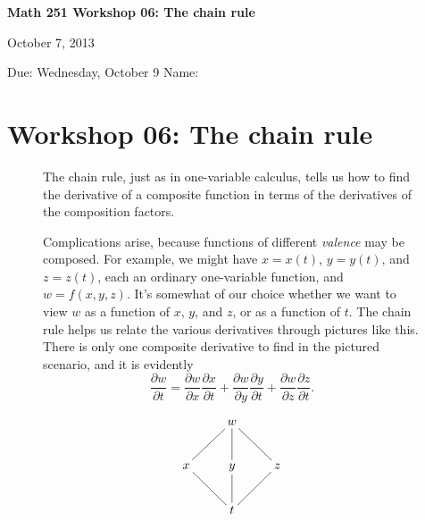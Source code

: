 \documentclass[12pt]{exam}
\theoremstyle{definition}
\begin{document}
\noindent
\textbf{{\large Math 251 \hfill Workshop 06: The chain rule}}

\noindent
October 7, 2013 

\noindent
Due: Wednesday, October 9 \hfill Name: \underline{\hspace{3in}} 

\noindent

\section{Workshop 06: The chain rule}

\begin{figure}[ht]
\begin{minipage}[t]{0.7\linewidth}
The chain rule, just as in one-variable calculus, tells us how to find the derivative of a composite function in terms of the derivatives of the composition factors.

Complications arise, because functions of different \emph{valence} may be composed. For example, we might have $x = x(t)$, $y = y(t)$, and $z = z(t)$, each an ordinary one-variable function, and $w = f(x,y,z)$. It's somewhat of our choice whether we want to view $w$ as a function of $x$, $y$, and $z$, or as a function of $t$. The chain rule helps us relate the various derivatives through pictures like this. There is only one composite derivative to find in the pictured scenario, and it is evidently
\begin{equation*}
    \frac{\partial w}{\partial t} = \frac{\partial w}{\partial x} \frac{\partial x}{\partial t} + \frac{\partial w}{\partial y} \frac{\partial y}{\partial t} + \frac{\partial w}{\partial z} \frac{\partial z}{\partial t}.    
\end{equation*} 
\end{minipage} \hspace*{1cm}
\begin{minipage}[t]{0.25\linewidth}
    \begin{equation*}
        \xymatrix{
              & w \ar@{-}[dl] \ar@{-}[d] \ar@{-}[dr] & \\
            x \ar@{-}[dr] & y \ar@{-}[d] & z \ar@{-}[dl] \\
            & t & 
        }
    \end{equation*}
\end{minipage}
\end{figure}
\end{document}
